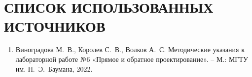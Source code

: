 \section*{СПИСОК ИСПОЛЬЗОВАННЫХ ИСТОЧНИКОВ}
\begin{enumerate}
\item Виноградова М.~В., Королев С.~В., Волков А.~С.
Методические указания к лабораторной работе №6
«Прямое и обратное проектирование». -- М.: МГТУ им. Н.~Э.~Баумана, 2022.
\end{enumerate}
